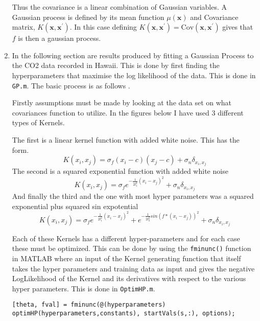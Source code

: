 \documentclass{article}
\newcommand{\Cov}{\mathrm{Cov}}
\begin{document}
\begin{enumerate}
	Thus the covariance is a linear combination of Gaussian variables. A Gaussian process is defined by its mean function $\mu(\textbf{x})$ and Covariance matrix, $K(\textbf{x},\textbf{x}^\prime)$. In this case defining $ K(\textbf{x},\textbf{x}^\prime) = \Cov(\textbf{x},\textbf{x}^\prime)$ gives that $f$ is then a gaussian process. 
	
	\item In the following section are results produced by fitting a Gaussian Process to the CO2 data recorded in Hawaii. This is done by first finding the hyperparameters that maximise the log likelihood of the data. This is done in \texttt{GP.m}. The basic process is as follows \cite{ebden2015gp}. 
	
	Firstly assumptions must be made by looking at the data set on what covariances function to utilize. In the figures below I have used 3 different types of Kernels. 
	
	The first is a linear kernel function with added white noise. This has the form. 
	\begin{equation}
			K(x_i,x_j) = \sigma_f (x_i - c) (x_j - c ) + \sigma_n \delta_{x_i, x_j}
	\end{equation}
	The second is a squared exponential function with added white noise 
	\begin{equation}
			K(x_i,x_j) = \sigma_f e^{-\frac{1}{2l_1^2}(x_i - x_j)^2} + \sigma_n \delta_{x_i, x_j}
	\end{equation}
	And finally the third and the one with most hyper parameters was a squared exponential plus squared sin expotential
	\begin{equation}
		K(x_i,x_j) = \sigma_f e^{-\frac{1}{2l_1^2}(x_i - x_j)^2} + e^{-\frac{1}{2l_2^2}sin(f*(x_i - x_j))^2} + \sigma_n \delta_{x_i, x_j}
	\end{equation}
	
	Each of these Kernels has a different hyper-parameters and for each case these must be optimized. This can be done by using the \texttt{fminunc()} function in MATLAB where an input of the Kernel generating function that itself takes the hyper parameters and training data as input and gives the negative LogLikelihood of the Kernel and its derivatives with respect to the various hyper parameters. This is done in \texttt{OptimHP.m}. 
	
\begin{lstlisting}
[theta, fval] = fminunc(@(hyperparameters) optimHP(hyperparameters,constants), startVals(s,:), options);
\end{lstlisting}	
	

\end{enumerate}
\end{document}
